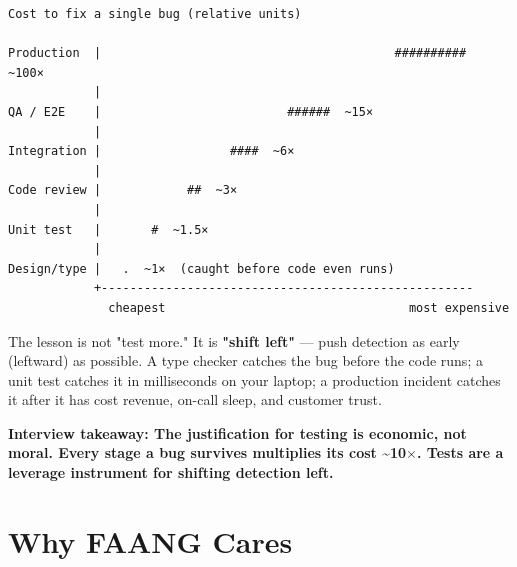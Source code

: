 \documentclass[11pt]{article}
\begin{document}
\begin{verbatim}
Cost to fix a single bug (relative units)

Production  |                                         ##########  ~100×
            |
QA / E2E    |                          ######  ~15×
            |
Integration |                  ####  ~6×
            |
Code review |            ##  ~3×
            |
Unit test   |       #  ~1.5×
            |
Design/type |   .  ~1×  (caught before code even runs)
            +----------------------------------------------------
              cheapest                                  most expensive
\end{verbatim}

The lesson is not "test more." It is \textbf{"shift left"} --- push detection as early (leftward) as possible. A type checker catches the bug before the code runs; a unit test catches it in milliseconds on your laptop; a production incident catches it after it has cost revenue, on-call sleep, and customer trust.

\textbf{Interview takeaway: The justification for testing is economic, not moral. Every stage a bug survives multiplies its cost \textasciitilde10\(\times\). Tests are a leverage instrument for shifting detection left.}

\section{Why FAANG Cares}\label{why-faang-cares}
\end{document}
